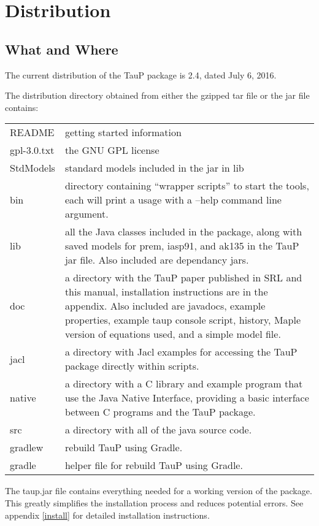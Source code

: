 
\section{Distribution}


\subsection{What and Where}
The current distribution of the TauP package is 2.4, dated July 6, 2016.

The distribution directory obtained from either the gzipped tar file or the jar file contains:

\begin{center}
\begin{tabular}{lp{4in}}
README & getting started information \\
gpl-3.0.txt & the GNU GPL license \\
StdModels & standard models included in the jar in lib \\
bin & directory containing ``wrapper scripts'' to start the tools,
   each will print a usage with a --help command line argument. \\
lib & all the Java classes included in the package, along with
               saved models for prem, iasp91, and ak135 in the TauP jar file.
               Also included are dependancy jars. \\
doc & a directory with the TauP paper published in SRL and this manual,
installation instructions are in the appendix. Also included are javadocs,
example properties, example taup console script, history, Maple version of equations used, and a simple model file.\\
jacl & a directory with Jacl examples for accessing the TauP package directly within scripts. \\
native & a directory with a C library and example program that use the
Java Native Interface, providing a basic interface between C programs
and the TauP package. \\
src & a directory with all of the java source code. \\
gradlew & rebuild TauP using Gradle. \\
gradle & helper file for rebuild TauP using Gradle. \\
\end{tabular}
\end{center}

The taup.jar file contains everything needed for a working version of the package.
This greatly simplifies the installation process and reduces potential errors.
See appendix \ref{install} for detailed installation instructions.

